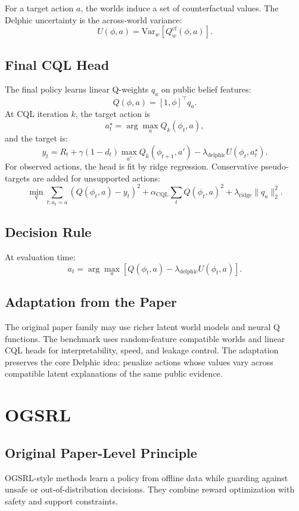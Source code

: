 \documentclass[11pt]{article}
\newcommand{\Var}{\mathrm{Var}}
\newcommand{\1}{\mathbf{1}}
\begin{document}
For a target action $a$, the worlds induce a set of counterfactual values.  The
Delphic uncertainty is the across-world variance:
\[
  U(\phi,a)=\Var_w[Q_w^{\mathrm{cf}}(\phi,a)].
\]

\subsection{Final CQL Head}

The final policy learns linear Q-weights $q_a$ on public belief features:
\[
  Q(\phi,a)=[1,\phi]^\top q_a.
\]
At CQL iteration $k$, the target action is
\[
  a^\star_t=\arg\max_a Q_k(\phi_t,a),
\]
and the target is:
\[
  y_t =
  R_t+\gamma(1-d_t)\max_{a'}Q_k(\phi_{t+1},a')
  -\lambda_{\mathrm{delphic}}U(\phi_t,a^\star_t).
\]
For observed actions, the head is fit by ridge regression.  Conservative
pseudo-targets are added for unsupported actions:
\[
  \min_q
  \sum_{t:a_t=a}(Q(\phi_t,a)-y_t)^2
  +\alpha_{\mathrm{CQL}}\sum_t Q(\phi_t,a)^2
  +\lambda_{\mathrm{ridge}}\|q_a\|_2^2.
\]

\subsection{Decision Rule}

At evaluation time:
\[
  a_t =
  \arg\max_a
  \left[
    Q(\phi_t,a)-\lambda_{\mathrm{delphic}}U(\phi_t,a)
  \right].
\]

\subsection{Adaptation from the Paper}

The original paper family may use richer latent world models and neural Q
functions.  The benchmark uses random-feature compatible worlds and linear CQL
heads for interpretability, speed, and leakage control.  The adaptation preserves
the core Delphic idea: penalize actions whose values vary across compatible
latent explanations of the same public evidence.

\section{OGSRL}

\subsection{Original Paper-Level Principle}

OGSRL-style methods learn a policy from offline data while guarding against
unsafe or out-of-distribution decisions.  They combine reward optimization with
safety and support constraints.
\end{document}
